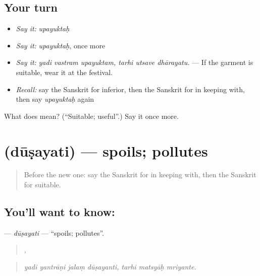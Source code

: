 \subsection*{Your turn}
\begin{itemize}
\raggedright
  \item \emph{Say it:} \emph{upayuktaḥ}
  \item \emph{Say it:} \emph{upayuktaḥ}, once more
  \item \emph{Say it:} \emph{yadi vastram upayuktam, tarhi utsave dhārayatu.} — If the garment is suitable, wear it at the festival.
  \item \emph{Recall:} say the Sanskrit for inferior, then the Sanskrit for in keeping with, then say \emph{upayuktaḥ} again
\end{itemize}

\begin{tcolorbox}[breakable,colback=teal!4,colframe=teal!35!black,title={Before you move on}]
What does  mean? (\textquotedblleft{}Suitable; useful\textquotedblright{}.) Say it once more.
\end{tcolorbox}
\section[\texorpdfstring{\sk{दूषयति} (dūṣayati)}{दूषयति (dūṣayati)}]{ (dūṣayati) — spoils; pollutes}

\label{lesson:SA-C391-dusayati}



\begin{quote}
Before the new one: say the Sanskrit for in keeping with, then the Sanskrit for suitable.
\end{quote}

\subsection*{You'll want to know: }
\textbf{} — \emph{dūṣayati} — \textquotedblleft{}spoils; pollutes\textquotedblright{}.

\begin{quote}
   ,   
\end{quote}

\begin{quote}
\emph{yadi yantrāṇi jalaṃ dūṣayanti, tarhi matsyāḥ mriyante.}
\end{quote}

